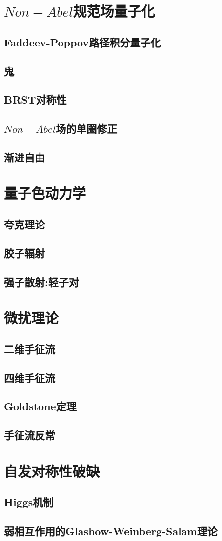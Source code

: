 \documentclass[a4paper,11pt]{book}
\begin{document}
\chapter{$Non-Abel$规范场量子化}
\section{Faddeev-Poppov路径积分量子化}
\section{鬼}
\section{BRST对称性}
\section{$Non-Abel$场的单圈修正}
\section{渐进自由}
\chapter{量子色动力学}
\section{夸克理论}
\section{胶子辐射}
\section{强子散射:轻子对}
\chapter{微扰理论}
\section{二维手征流}
\section{四维手征流}
\section{Goldstone定理}
\section{手征流反常}
\chapter{自发对称性破缺}
\section{Higgs机制}
\section{弱相互作用的Glashow-Weinberg-Salam理论}
\end{document}
